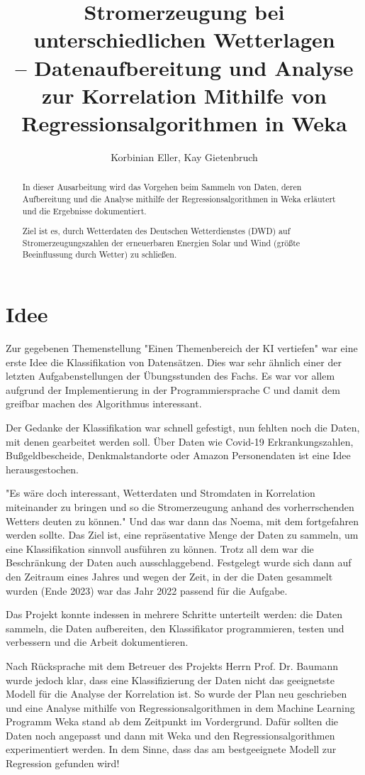 \documentclass[letterpaper]{article} %
\title{Stromerzeugung bei unterschiedlichen Wetterlagen\\-- Datenaufbereitung und Analyse zur Korrelation Mithilfe von Regressionsalgorithmen in Weka}
\author {
    Korbinian Eller,
    Kay Gietenbruch
}
\begin{document}
\maketitle
\begin{abstract}
    In dieser Ausarbeitung wird das Vorgehen beim Sammeln von Daten, deren Aufbereitung und die Analyse mithilfe der Regressionsalgorithmen in Weka erläutert und die Ergebnisse dokumentiert.
    
    Ziel ist es, durch Wetterdaten des Deutschen Wetterdienstes (DWD) auf Stromerzeugungszahlen der erneuerbaren Energien Solar und Wind (größte Beeinflussung durch Wetter) zu schließen.
\end{abstract}
\section*{Idee}
    Zur gegebenen Themenstellung "Einen Themenbereich der KI vertiefen" war eine erste Idee die Klassifikation von Datensätzen. Dies war sehr ähnlich einer der letzten Aufgabenstellungen der Übungsstunden des Fachs. Es war vor allem aufgrund der Implementierung in der Programmiersprache C und damit dem greifbar machen des Algorithmus interessant.

    Der Gedanke der Klassifikation war schnell gefestigt, nun fehlten noch die Daten, mit denen gearbeitet werden soll. Über Daten wie Covid-19 Erkrankungszahlen, Bußgeldbescheide, Denkmalstandorte oder Amazon Personendaten ist eine Idee herausgestochen.

    "Es wäre doch interessant, Wetterdaten und Stromdaten in Korrelation miteinander zu bringen und so die Stromerzeugung anhand des vorherrschenden Wetters deuten zu können." Und das war dann das Noema, mit dem fortgefahren werden sollte. Das Ziel ist, eine repräsentative Menge der Daten zu sammeln, um eine Klassifikation sinnvoll ausführen zu können. Trotz all dem war die Beschränkung der Daten auch ausschlaggebend. Festgelegt wurde sich dann auf den Zeitraum eines Jahres und wegen der Zeit, in der die Daten gesammelt wurden (Ende 2023) war das Jahr 2022 passend für die Aufgabe.
    
    Das Projekt konnte indessen in mehrere Schritte unterteilt werden: die Daten sammeln, die Daten aufbereiten, den Klassifikator programmieren, testen und verbessern und die Arbeit dokumentieren.

    Nach Rücksprache mit dem Betreuer des Projekts Herrn Prof. Dr. Baumann wurde jedoch klar, dass eine Klassifizierung der Daten nicht das geeignetste Modell für die Analyse der Korrelation ist. So wurde der Plan neu geschrieben und eine Analyse mithilfe von Regressionsalgorithmen in dem Machine Learning Programm Weka stand ab dem Zeitpunkt im Vordergrund. Dafür sollten die Daten noch angepasst und dann mit Weka und den Regressionsalgorithmen experimentiert werden. In dem Sinne, dass das am bestgeeignete Modell zur Regression gefunden wird!
\end{document}
